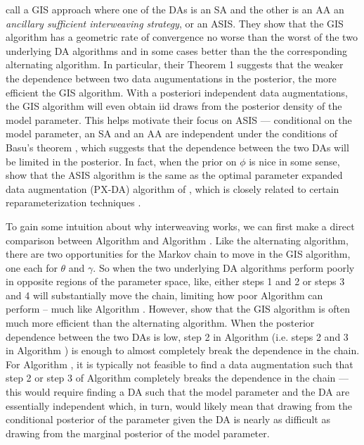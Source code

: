 \documentclass{article}
\begin{document}
 call a GIS approach where one of the DAs is an SA and the other is an AA an {\it ancillary sufficient interweaving strategy}, or an ASIS. They show that the GIS algorithm has a geometric rate of convergence no worse than the worst of the two underlying DA algorithms and in some cases better than the the corresponding alternating algorithm. In particular, their Theorem 1 suggests that the weaker the dependence between two data augumentations in the posterior, the more efficient the GIS algorithm. With a posteriori independent data augmentations, the GIS algorithm will even obtain iid draws from the posterior density of the model parameter. This helps motivate their focus on ASIS --- conditional on the model parameter, an SA and an AA are independent under the conditions of Basu's theorem \cite{basu1955statistics}, which suggests that the dependence between the two DAs will be limited in the posterior. In fact, when the prior on $\phi$ is nice in some sense,  show that the ASIS algorithm is the same as the optimal parameter expanded data augmentation (PX-DA) algorithm of , which is closely related to certain reparameterization techniques  \cite{hobert2008theoretical}.

To gain some intuition about why interweaving works, we can first make a direct comparison between Algorithm  and Algorithm . Like the alternating algorithm, there are two opportunities for the Markov chain to move in the GIS algorithm, one each for $\theta$ and $\gamma$. So when the two underlying DA algorithms perform poorly in opposite regions of the parameter space, like, either steps 1 and 2 or steps 3 and 4 will substantially move the chain, limiting how poor Algorithm  can perform -- much like Algorithm . However,  show that the GIS algorithm is often much more efficient than the alternating algorithm. When the posterior dependence between the two DAs is low, step 2 in Algorithm  (i.e. steps 2 and 3 in Algorithm ) is enough to almost completely break the dependence in the chain. For Algorithm , it is typically not feasible to find a data augmentation such that step 2 or step 3 of Algorithm  completely breaks the dependence in the chain --- this would require finding a DA such that the model parameter and the DA are essentially independent which, in turn, would likely mean that drawing from the conditional posterior of the parameter given the DA is nearly as difficult as drawing from the marginal posterior of the model parameter.
\end{document}
